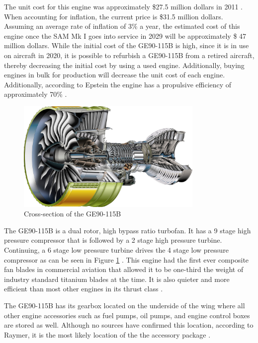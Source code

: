 The unit cost for this engine was approximately \$27.5 million dollars in 2011 \cite{gecost}. When accounting for inflation, the current price is \$31.5 million dollars. Assuming an average rate of inflation of 3\% a year, the estimated cost of this engine once the SAM Mk I goes into service in 2029 will be approximately \$ 47 million dollars. While the initial cost of the GE90-115B is high, since it is in use on aircraft in 2020, it is possible to refurbish a GE90-115B from a retired aircraft, thereby decreasing the initial cost by using a used engine. Additionally, buying engines in bulk for production will decrease the unit cost of each engine. Additionally, according to Epstein the engine has a propulsive efficiency of approximately 70\% \cite{epstein}.

\begin{figure} [h!]
    \centering
    \includegraphics[width=0.8\textwidth]{Photos/ge90cross.jpg}
    \caption{Cross-section of the GE90-115B}
    \label{fig:GeCross}
\end{figure}

The GE90-115B is a dual rotor, high bypass ratio turbofan. It has a 9 stage high pressure compressor that is followed by a 2 stage high pressure turbine. Continuing, a 6 stage low pressure turbine drives the 4 stage low pressure compressor as can be seen in Figure \ref{fig:GeCross} \cite{gecross}. This engine had the first ever composite fan blades in commercial aviation that allowed it to be one-third the weight of industry standard titanium blades at the time. It is also quieter and more efficient than most other engines in its thrust class \cite{ge90}.

The GE90-115B has its gearbox located on the underside of the wing where all other engine accessories such as fuel pumps, oil pumps, and engine control boxes are stored as well. Although no sources have confirmed this location, according to Raymer, it is the most likely location of the the accessory package \cite{raymer}.

